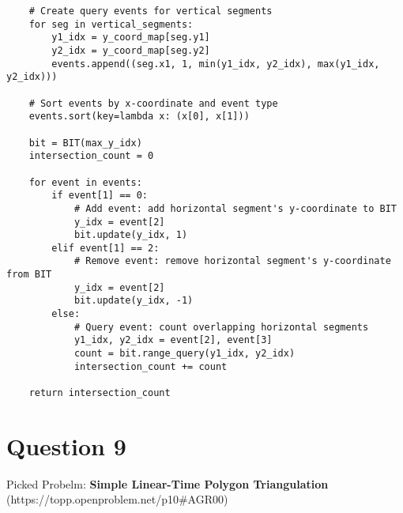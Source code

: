 \documentclass{article}
\begin{document}
\begin{verbatim}
    # Create query events for vertical segments
    for seg in vertical_segments:
        y1_idx = y_coord_map[seg.y1]
        y2_idx = y_coord_map[seg.y2]
        events.append((seg.x1, 1, min(y1_idx, y2_idx), max(y1_idx, y2_idx)))

    # Sort events by x-coordinate and event type
    events.sort(key=lambda x: (x[0], x[1]))

    bit = BIT(max_y_idx)
    intersection_count = 0

    for event in events:
        if event[1] == 0:
            # Add event: add horizontal segment's y-coordinate to BIT
            y_idx = event[2]
            bit.update(y_idx, 1)
        elif event[1] == 2:
            # Remove event: remove horizontal segment's y-coordinate from BIT
            y_idx = event[2]
            bit.update(y_idx, -1)
        else:
            # Query event: count overlapping horizontal segments
            y1_idx, y2_idx = event[2], event[3]
            count = bit.range_query(y1_idx, y2_idx)
            intersection_count += count

    return intersection_count
\end{verbatim}

\newpage

\section*{Question 9}
Picked Probelm: \textbf{Simple Linear-Time Polygon Triangulation} 
\\
(https://topp.openproblem.net/p10#AGR00)
\\
\end{document}
